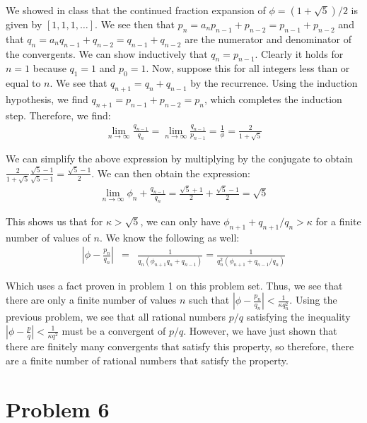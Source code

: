 \documentclass[psamsfonts]{amsart}
\newenvironment{sol}{{\bfseries Solution}}{\qedsymbol}
\theoremstyle{definition}
\theoremstyle{remark}
\numberwithin{equation}{section}
\begin{document}
\begin{sol}
We showed in class that the continued fraction expansion of $\phi = (1 + \sqrt{5})/2$ is given by $[1,1,1,\ldots]$. We see then that $p_n = a_n p_{n-1} + p_{n-2} = p_{n-1} + p_{n-2}$ and that $q_n = a_n q_{n-1} + q_{n-2} = q_{n-1} + q_{n-2}$ are the numerator and denominator of the convergents. We can show inductively that $q_n = p_{n-1}$. Clearly it holds for $n = 1$ because $q_1 = 1$ and $p_0 = 1$. Now, suppose this for all integers less than or equal to $n$. We see that $q_{n+1} = q_{n} + q_{n-1}$ by the recurrence. Using the induction hypothesis, we find $q_{n+1} = p_{n-1} + p_{n-2} = p_n$, which completes the induction step. Therefore, we find:
\begin{eqnarray}
\lim_{n \to \infty} \frac{q_{n-1}}{q_n} = \lim_{n \to \infty} \frac{q_{n-1}}{p_{n-1}} = \frac{1}{\phi} = \frac{2}{1 + \sqrt{5}} 
\end{eqnarray}

We can simplify the above expression by multiplying by the conjugate to obtain $\frac{2}{1 + \sqrt{5}} \frac{\sqrt{5} - 1}{\sqrt{5} - 1} = \frac{\sqrt{5} - 1}{2}$. We can then obtain the expression:
\begin{eqnarray}
\lim_{n \to \infty} \phi_{n} + \frac{q_{n-1}}{q_n} = \frac{\sqrt{5}+1}{2} + \frac{\sqrt{5} - 1}{2} = \sqrt{5}
\end{eqnarray}

This shows us that for $\kappa > \sqrt{5}$, we can only have $\phi_{n+1} + {q_{n+1}}/ q_n > \kappa$ for a finite number of values of $n$. We know the following as well:
\begin{eqnarray}
\left| \phi - \frac{p_n}{q_n} \right| &=& \frac{1}{q_n (\phi_{n+1} q_n + q_{n-1})} = \frac{1}{q_n^2 (\phi_{n+1} + q_{n-1}/q_n)} 
\end{eqnarray}

Which uses a fact proven in problem 1 on this problem set. Thus, we see that there are only a finite number of values $n$ such that $| \phi - \frac{p_n}{q_n} | < \frac{1}{\kappa q_n^2}$. Using the previous problem, we see that all rational numbers $p/q$ satisfying the inequality $|\phi - \frac{p}{q}| < \frac{1}{\kappa q^2}$ must be a convergent of $p/q$. However, we have just shown that there are finitely many convergents that satisfy this property, so therefore, there are a finite number of rational numbers that satisfy the property.
\end{sol}

\section{Problem 6}
\end{document}
